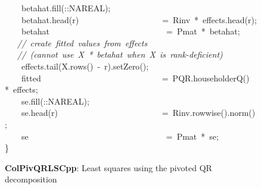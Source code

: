 \documentclass[shortnames,article]{jss}
\newcommand{\hlstd}[1]{\textcolor[rgb]{0,0,0}{#1}}
\newcommand{\hlopt}[1]{\textcolor[rgb]{0,0,0}{#1}}
\newcommand{\hlslc}[1]{\textcolor[rgb]{0.67,0.13,0.13}{\it{#1}}}
\newcommand{\hlkwd}[1]{\textcolor[rgb]{0,0,0}{#1}}
\begin{document}
\begin{figure}[htb]
    \hlstd{}\hlstd{\ \ \ \ }\hlstd{betahat}\hlopt{.}\hlstd{}\hlkwd{fill}\hlstd{}\hlopt{(::}\hlstd{NA\textunderscore REAL}\hlopt{);}\hspace*{\fill}\\
    \hlstd{}\hlstd{\ \ \ \ }\hlstd{betahat}\hlopt{.}\hlstd{}\hlkwd{head}\hlstd{}\hlopt{(}\hlstd{r}\hlopt{)}\hlstd{\ \ \ \ \ \ \ \ \ \ \ \ \ \ \ \ \ \ \ \ }\hlopt{=\ }\hlstd{Rinv\ }\hlopt{{*}\ }\hlstd{effects}\hlopt{.}\hlstd{}\hlkwd{head}\hlstd{}\hlopt{(}\hlstd{r}\hlopt{);}\hspace*{\fill}\\
    \hlstd{}\hlstd{\ \ \ \ }\hlstd{betahat}\hlstd{\ \ \ \ \ \ \ \ \ \ \ \ \ \ \ \ \ \ \ \ \ \ \ \ \ \ \ \ }\hlstd{}\hlopt{=\ }\hlstd{Pmat\ }\hlopt{{*}\ }\hlstd{betahat}\hlopt{;}\hspace*{\fill}\\
    \hlstd{}\hlstd{\ \ \ }\hlstd{}\hlslc{//\ create\ fitted\ values\ from\ effects}\hspace*{\fill}\\
    \hlstd{}\hlstd{\ \ \ }\hlstd{}\hlslc{//\ (cannot\ use\ X\ {*}\ betahat\ when\ X\ is\ rank{-}deficient)}\hspace*{\fill}\\
    \hlstd{}\hlstd{\ \ \ \ }\hlstd{effects}\hlopt{.}\hlstd{}\hlkwd{tail}\hlstd{}\hlopt{(}\hlstd{X}\hlopt{.}\hlstd{}\hlkwd{rows}\hlstd{}\hlopt{()\ {-}\ }\hlstd{r}\hlopt{).}\hlstd{}\hlkwd{setZero}\hlstd{}\hlopt{();}\hspace*{\fill}\\
    \hlstd{}\hlstd{\ \ \ \ }\hlstd{fitted}\hlstd{\ \ \ \ \ \ \ \ \ \ \ \ \ \ \ \ \ \ \ \ \ \ \ \ \ \ \ \ \ }\hlstd{}\hlopt{=\ }\hlstd{PQR}\hlopt{.}\hlstd{}\hlkwd{householderQ}\hlstd{}\hlopt{()\ {*}\ }\hlstd{effects}\hlopt{;}\hspace*{\fill}\\
    \hlstd{}\hlstd{\ \ \ \ }\hlstd{se}\hlopt{.}\hlstd{}\hlkwd{fill}\hlstd{}\hlopt{(::}\hlstd{NA\textunderscore REAL}\hlopt{);}\hspace*{\fill}\\
    \hlstd{}\hlstd{\ \ \ \ }\hlstd{se}\hlopt{.}\hlstd{}\hlkwd{head}\hlstd{}\hlopt{(}\hlstd{r}\hlopt{)}\hlstd{\ \ \ \ \ \ \ \ \ \ \ \ \ \ \ \ \ \ \ \ \ \ \ \ \ }\hlopt{=\ }\hlstd{Rinv}\hlopt{.}\hlstd{}\hlkwd{rowwise}\hlstd{}\hlopt{().}\hlstd{}\hlkwd{norm}\hlstd{}\hlopt{();}\hspace*{\fill}\\
    \hlstd{}\hlstd{\ \ \ \ }\hlstd{se}\hlstd{\ \ \ \ \ \ \ \ \ \ \ \ \ \ \ \ \ \ \ \ \ \ \ \ \ \ \ \ \ \ \ \ \ }\hlstd{}\hlopt{=\ }\hlstd{Pmat\ }\hlopt{{*}\ }\hlstd{se}\hlopt{;}\hspace*{\fill}\\
    \hlstd{}\hlopt{\}}\hlstd{}\hspace*{\fill}
    \normalfont
    \normalsize
  \caption{\textbf{ColPivQRLSCpp}: Least squares using the pivoted QR decomposition}
  \label{ColPivQRLS}
\end{figure}
\end{document}
